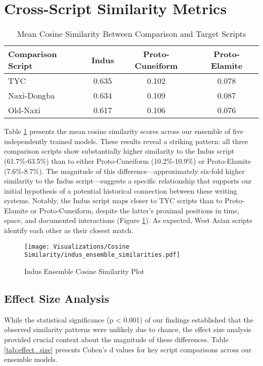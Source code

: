 \documentclass[11pt,a4paper,oneside]{report}
\begin{document}
\section{Cross-Script Similarity Metrics}
\noindent\hspace{1cm}
\begin{table}[H]
\centering
\caption{Mean Cosine Similarity Between Comparison and Target Scripts}
\label{tab:mean_similarity}
\begin{tabular}{lccc}
\hline
\textbf{Comparison Script} & \textbf{Indus} & \textbf{Proto-Cuneiform} & \textbf{Proto-Elamite} \\
\hline
TYC & 0.635 & 0.102 & 0.078 \\
Naxi-Dongba & 0.634 & 0.109 & 0.087 \\
Old-Naxi & 0.617 & 0.106 & 0.076 \\
\hline
\end{tabular}
\end{table}

Table \ref{tab:mean_similarity} presents the mean cosine similarity scores across our ensemble of five independently trained models. These results reveal a striking pattern: all three comparison scripts show substantially higher similarity to the Indus script (61.7\%-63.5\%) than to either Proto-Cuneiform (10.2\%-10.9\%) or Proto-Elamite (7.6\%-8.7\%). The magnitude of this difference—approximately six-fold higher similarity to the Indus script—suggests a specific relationship that supports our initial hypothesis of a potential historical connection between these writing systems. Notably, the Indus script maps closer to TYC scripts than to Proto-Elamite or Proto-Cuneiform, despite the latter's proximal positions in time, space, and documented interactions (Figure \ref{fig:cosine}). As expected, West Asian scripts identify each other as their closest match.

\begin{figure}[H]  
    \centering
    \texttt{[image: Visualizations/Cosine Similarity/indus\_ensemble\_similarities.pdf]}
    \caption{Indus Ensemble Cosine Similarity Plot}
    \label{fig:cosine}
\end{figure}

\subsection{Effect Size Analysis}
\noindent\hspace{1cm}

While the statistical significance (p < 0.001) of our findings established that the observed similarity patterns were unlikely due to chance, the effect size analysis provided crucial context about the magnitude of these differences. Table \ref{tab:effect_size} presents Cohen's d values for key script comparisons across our ensemble models.
\end{document}
